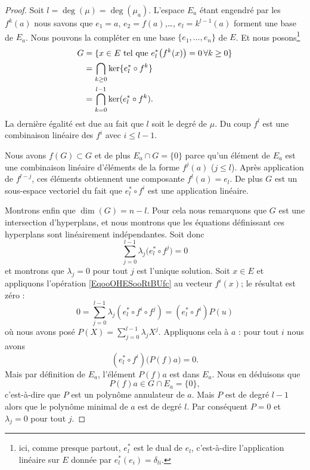 \begin{proof}
    Soit \( l=\deg(\mu)=\deg(\mu_a)\). L'espace \( E_a\) étant engendré par les \( f^k(a)\) nous savons que \( e_1=a\), \( e_2=f(a)\),\ldots, \( e_l=k^{l-1}(a)\) forment une base de \( E_a\). Nous pouvons la compléter en une base \( \{ e_1,\ldots, e_n \}\) de \( E\). Et nous posons\footnote{ici, comme presque partout, \( e^*_{l}\) est le dual de \( e_l\), c'est-à-dire l'application linéaire sur \( E\) donnée par \( e^*_l(e_i)=\delta_{li}\). }
    \begin{subequations}
        \begin{align}
            G&=\{ x\in E\text{ tel que } e^*_l\big( f^k(x) \big)=0\,\forall k\geq 0 \}\\
            &=\bigcap_{k\geq 0}\ker\{ e^*_l\circ f^k \}\\
            &=\bigcap_{k=0}^{l-1}\ker(  e^*_l\circ f^k ).
        \end{align}
    \end{subequations}
    La dernière égalité est due au fait que \( l\) soit le degré de \( \mu\). Du coup \( f^l\) est une combinaison linéaire des \( f^i\) avec \( i\leq l-1\).

    Nous avons \( f(G)\subset G\) et de plus \( E_a\cap G=\{ 0 \}\) parce qu'un élément de \( E_a\) est une combinaison linéaire d'éléments de la forme \( f^j(a)\) (\( j\leq l\)). Après application de \( f^{l-j}\), ces éléments obtiennent une composante \( f^l(a)=e_l\). De plus \( G\) est un sous-espace vectoriel du fait que \( e^*_l\circ f^i\) est une application linéaire.

    Montrons enfin que \( \dim(G)=n-l\). Pour cela nous remarquons que \( G\) est une intersection d'hyperplans, et nous montrons que les équations définissant ces hyperplans sont linéairement indépendantes. Soit donc
    \begin{equation}        \label{EqooOHESooRtBUfc}
        \sum_{j=0}^{l-1}\lambda_j\big( e^*_l\circ f^j \big)=0
    \end{equation}
    et montrons que \( \lambda_j=0\) pour tout $j$ est l'unique solution. Soit \( x\in E\) et appliquons l'opération \eqref{EqooOHESooRtBUfc} au vecteur \( f^i(x)\); le résultat est zéro :
    \begin{equation}
        0=\sum_{j=0}^{l-1}\lambda_j(e^*_l\circ f^i\circ f^j)=(e^*_l\circ f^i)P(u)
    \end{equation}
    où nous avons posé \( P(X)=\sum_{j=0}^{l-1}\lambda_jX^j\). Appliquons cela à \( a\) : pour tout \( i\) nous avons
    \begin{equation}
        (e^*_l\circ f^i)\big( P(f)a \big)=0.
    \end{equation}
    Mais par définition de \( E_a\), l'élément \(P(f)a \) est dans \( E_a\). Nous en déduisons que
    \begin{equation}
        P(f)a\in G\cap E_a=\{ 0 \},
    \end{equation}
    c'est-à-dire que \( P\) est un polynôme annulateur de \( a\). Mais \( P\) est de degré \( l-1\) alors que le polynôme minimal de \( a\) est de degré \( l\). Par conséquent \( P=0\) et \( \lambda_j=0\) pour tout \( j\).
\end{proof}

